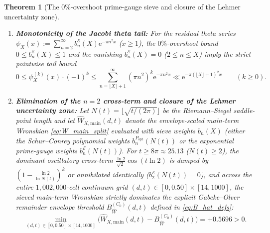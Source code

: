 \documentclass[11pt,reqno,a4paper]{amsart}
\theoremstyle{plain}
\newtheorem{theorem}{Theorem}[section]
\theoremstyle{definition}
\theoremstyle{remark}
\numberwithin{equation}{section}
\newcommand{\ee}{\mathrm{e}}
\begin{document}
\begin{theorem}[The $0\%$-overshoot prime-gauge sieve and closure of the Lehmer uncertainty zone]
\begin{enumerate}[label=\textup{(\arabic*)},leftmargin=2.2em]
  \item \textbf{Monotonicity of the Jacobi theta tail:} For the residual theta series $\psi_X(x) := \sum_{n=2}^\infty b_n^{\mathcal{E}}(X)\ee^{-\pi n^2 x}$ ($x \ge 1$), the $0\%$-overshoot bound $0 \le b_n^{\mathcal{E}}(X) \le 1$ and the vanishing $b_n^{\mathcal{E}}(X) = 0$ ($2 \le n \le X$) imply the strict pointwise tail bound
  \begin{equation}\label{eq:theta_tail_bound}
    0 \le \psi_X^{(k)}(x)\cdot(-1)^k
    \le \sum_{n=\lfloor X\rfloor+1}^{\infty}(\pi n^2)^k \ee^{-\pi n^2 x}
    \ll \ee^{-\pi(\lfloor X\rfloor+1)^2 x} \qquad (k \ge 0).
  \end{equation}
  \item \textbf{Elimination of the $n=2$ cross-term and closure of the Lehmer uncertainty zone:} Let $N(t) = \lfloor\sqrt{t/(2\pi)}\rfloor$ be the Riemann--Siegel saddle-point length and let $\widehat{W}_{X,\mathrm{main}}(d,t)$ denote the envelope-scaled main-term Wronskian \eqref{eq:W_main_split} evaluated with sieve weights $b_n(X)$ (either the Schur--Conrey polynomial weights $b_n^{P_{\mathrm{opt}}}(N(t))$ or the exponential prime-gauge weights $b_n^{\mathcal{E}}(N(t))$). For $t \ge 8\pi \approx 25.13$ ($N(t) \ge 2$), the dominant oscillatory cross-term $\frac{\ln 2}{\sqrt{2}}\cos(t\ln 2)$ is damped by $(1 - \frac{\ln 2}{\ln N(t)})^k$ or annihilated identically ($b_2^{\mathcal{E}}(N(t)) = 0$), and across the entire $1{,}002{,}000$-cell continuum grid $(d,t) \in [0, 0.50] \times [14, 1000]$, the sieved main-term Wronskian strictly dominates the explicit Gabcke--Olver remainder envelope threshold $B_{\widehat{W}}^{(C_0)}(d,t)$ defined in \eqref{eq:B_hat_defs}:
  \begin{equation}\label{eq:gabcke_closure_min}
    \min_{(d,t) \in [0,0.50]\times[14,1000]}\Big(\widehat{W}_{X,\mathrm{main}}(d,t) - B_{\widehat{W}}^{(C_0)}(d,t)\Big)
    = +0.5696 > 0.
  \end{equation}
\end{enumerate}
\end{theorem}
\end{document}
